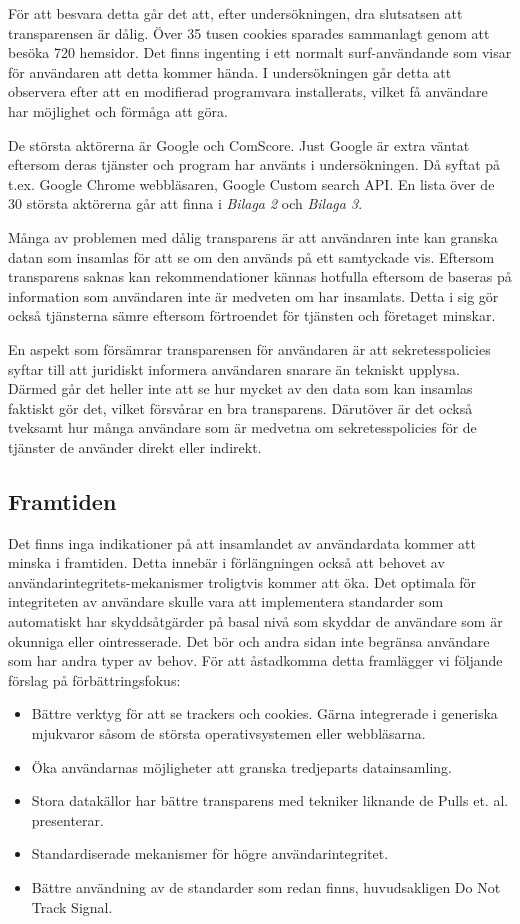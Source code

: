 \documentclass[a4paper,11pt]{article}
\begin{document}
{För att besvara detta går det att, efter undersökningen, dra slutsatsen att transparensen är dålig. Över 35 tusen cookies sparades sammanlagt genom att besöka 720 hemsidor. Det finns ingenting i ett normalt surf-användande som visar för användaren att detta kommer hända. I undersökningen går detta att observera efter att en modifierad programvara installerats, vilket få användare har möjlighet och förmåga att göra. 

De största aktörerna är Google och ComScore. Just Google är extra väntat eftersom deras tjänster och program har använts i undersökningen. Då syftat på t.ex. Google Chrome webbläsaren, Google Custom search API. En lista över de 30 största aktörerna går att finna i \textit{Bilaga 2} och \textit{Bilaga 3}. 

Många av problemen med dålig transparens är att användaren inte kan granska datan som insamlas för att se om den används på ett samtyckade vis. Eftersom transparens saknas kan rekommendationer kännas hotfulla eftersom de baseras på information som användaren inte är medveten om har insamlats. Detta i sig gör också tjänsterna sämre eftersom förtroendet för tjänsten och företaget minskar.

En aspekt som försämrar transparensen för användaren är att sekretesspolicies syftar till att juridiskt informera användaren snarare än tekniskt upplysa. Därmed går det heller inte att se hur mycket av den data som kan insamlas faktiskt gör det, vilket försvårar en bra transparens. Därutöver är det också tveksamt hur många användare som är medvetna om sekretesspolicies för de tjänster de använder direkt eller indirekt. 

\subsection{Framtiden}
Det finns inga indikationer på att insamlandet av användardata kommer att minska i framtiden. Detta innebär i förlängningen också att behovet av användarintegritets-mekanismer troligtvis kommer att öka. Det optimala för integriteten av användare skulle vara att implementera standarder som automatiskt har skyddsåtgärder på basal nivå som skyddar de användare som är okunniga eller ointresserade. Det bör och andra sidan inte begränsa användare som har andra typer av behov. För att åstadkomma detta framlägger vi följande förslag på förbättringsfokus: 

\begin{itemize}
	\item Bättre verktyg för att se trackers och cookies. Gärna integrerade i generiska mjukvaror såsom de största operativsystemen eller webbläsarna.
	\item Öka användarnas möjligheter att granska tredjeparts datainsamling.
	\item Stora datakällor har bättre transparens med tekniker liknande de Pulls et. al. \cite{Pulls} presenterar.
	\item Standardiserade mekanismer för högre användarintegritet.
	\item Bättre användning av de standarder som redan finns, huvudsakligen Do Not Track Signal.
\end{itemize}

}
\end{document}
